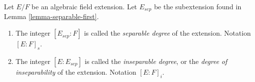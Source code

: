 \begin{definition}
\label{definition-insep-degree}
Let $E/F$ be an algebraic field extension. Let $E_{sep}$ be the subextension
found in Lemma \ref{lemma-separable-first}.
\begin{enumerate}
\item The integer $[E_{sep} : F]$ is called the {\it separable
degree} of the extension. Notation $[E : F]_s$.
\item The integer $[E : E_{sep}]$ is called the {\it inseparable
degree}, or the {\it degree of inseparability} of the extension.
Notation $[E : F]_i$.
\end{enumerate}
\end{definition}